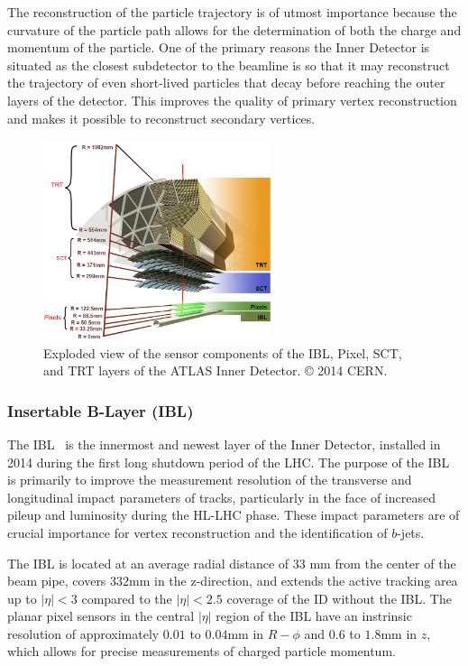 The reconstruction of the particle trajectory is of utmost importance because the curvature of the particle path allows for the determination of both the charge and momentum of the particle.
One of the primary reasons the Inner Detector is situated as the closest subdetector to the beamline is so that it may reconstruct the trajectory of even short-lived particles that decay before reaching the outer layers of the detector.
This improves the quality of primary vertex reconstruction and makes it possible to reconstruct secondary vertices. 

\begin{figure}
	\centering
	\includegraphics[width=0.6\textwidth]{inner_detector_zoomed}
	\caption{Exploded view of the sensor components of the IBL, Pixel, SCT, and TRT layers of the ATLAS Inner Detector. © 2014 CERN.}
	\label{fig:inner_detector_zoomed_cgi}
\end{figure}

\subsubsection{Insertable B-Layer (IBL)}
The IBL~\cite{Capeans:1291633, Abbott:2018ikt} is the innermost and newest layer of the Inner Detector, installed in 2014 during the first long shutdown period of the LHC.
The purpose of the IBL is primarily to improve the measurement resolution of the transverse and longitudinal impact parameters of tracks, particularly in the face of increased pileup and luminosity during the HL-LHC phase.
These impact parameters are of crucial importance for vertex reconstruction and the identification of $b$-jets. 

The IBL is located at an average radial distance of 33 mm from the center of the beam pipe, covers $332$mm in the z-direction, and extends the active tracking area up to $|\eta| < 3$ compared to the $|\eta| < 2.5$ coverage of the ID without the IBL.
The planar pixel sensors in the central $|\eta|$ region of the IBL have an instrinsic resolution of approximately $0.01$ to $0.04$mm in $R-\phi$ and $0.6$ to $1.8$mm in $z$, which allows for precise measurements of charged particle momentum.

